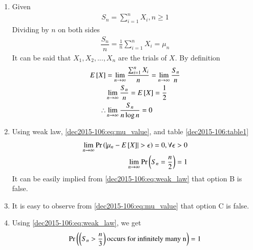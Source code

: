 \begin{table}[htp]
\centering
\caption{Variables and their definitions}
\label{dec2015-106:table1}
\end{table}
\begin{enumerate}
\item 
Given
\begin{align}
\displaystyle S_n=\sum_{i=1}^{n}X_i , n\ge 1
\end{align}
Dividing by $n$ on both sides
\begin{align}
\dfrac{S_n}{n}=\displaystyle\frac{1}{n} \sum_{i=1}^{n}X_i=\mu_n
\end{align}
It can be said that $X_1,X_2,...,X_n$ are the trials of $X$. By definition
\begin{align}
E{}\left[X\right]&=\displaystyle \lim_{n\to \infty} \frac{\sum_{i=1}^{n}X_i}{n}=\lim_{n\to \infty} \frac{S_n}{n}\\
&\lim_{n\to \infty} \frac{S_n}{n}=E{}\left[X\right]=\frac{1}{2} \label{dec2015-106:eq:mu_value} \\
\therefore&\lim_{n\to \infty} \frac{S_n}{n\log{n}}=0
\end{align}
\item
Using weak law, \eqref{dec2015-106:eq:mu_value}, and table \eqref{dec2015-106:table1}
\begin{align}
\lim_{n\to\infty} \Pr\left(\left\vert\mu_n-E{}\left[X\right]\right\vert>\epsilon\right)=0, \forall \epsilon >0\\
\displaystyle \lim_{n\to\infty} \Pr\left(S_n=\frac{n}{2}\right)=1 \label{dec2015-106:eq:weak_law}
\end{align}
It can be easily implied from \eqref{dec2015-106:eq:weak_law} that option B is false.
\item 
It is easy to observe from \eqref{dec2015-106:eq:mu_value} that option C is false.
\item
Using \eqref{dec2015-106:eq:weak_law}, we get
\begin{align}
\Pr\left(\left(S_n>\frac{n}{3}\right)\text{occurs for infinitely many n}\right)=1
\end{align}
\end{enumerate}